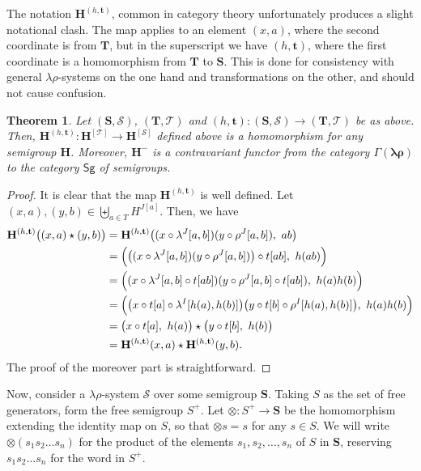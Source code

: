 \documentclass{amsart}
\newtheorem{theorem}{Theorem}
\newcommand{\blambda}{\boldsymbol{\lambda}}
\newcommand{\brho}{\boldsymbol{\rho}}
\begin{document}
The notation $\mathbf{H}^{(h,\mathbf{t})}$, common in category theory 
unfortunately produces a slight notational clash. The map applies to an element
$(x,a)$, where the second coordinate is from $\mathbf{T}$,
but in the superscript we have  $(h,\mathbf{t})$, where the first coordinate is
a homomorphism from $\mathbf{T}$ to $\mathbf{S}$. This is done for consistency
with general $\lambda\rho$-systems on the one hand and
transformations on the other, and should not cause confusion. 


\begin{theorem}\label{trans}
Let $(\mathbf{S},\mathcal{S})$, $(\mathbf{T},\mathcal{T})$ and
$(h, \mathbf{t})\colon (\mathbf{S},\mathcal{S})\to (\mathbf{T},\mathcal{T})$
be as above. Then,
$\mathbf{H}^{(h,\mathbf{t})}\colon 
\mathbf{H}^{[\mathcal{T}]} \to \mathbf{H}^{[\mathcal{S}]}$ defined above
is a homomorphism for any semigroup $\mathbf{H}$.
Moreover, $\mathbf{H}^{-}$ is a contravariant functor from the category
$\Gamma(\blambda\brho)$ to the category $\mathsf{Sg}$ of semigroups.
\end{theorem}

\begin{proof}
It is clear that the map $\mathbf{H}^{(h, \mathbf{t})}$ is well defined.
Let $(x,a), (y,b)\in \biguplus_{a\in T} H^{J[a]}$. Then, we have
\begin{align*}
\mathbf{H}^{(h, \mathbf{t})}\bigl((x,a)\star (y,b)\bigr)
&=\mathbf{H}^{(h,\mathbf{t})}\bigl((x\circ\lambda^J[{a,b}])
    (y\circ\rho^J[{a,b}]),\ ab\bigr)\\ 
&= \Bigl(\bigl((x\circ\lambda^J[{a,b}])(y\circ\rho^J[{a,b}])\bigr)\circ t[ab],\
                                          h(ab)\Bigr)\\   
&= \Bigl((x\circ\lambda^J[{a,b}]\circ t[ab])(y\circ\rho^J[{a,b}]\circ t[ab]),\
h(a)h(b)\Bigr) \\
&= \Bigl(\bigl(x\circ t[a]\circ \lambda^I[{h(a),h(b)}]\bigr)
    \bigl(y\circ t[b]\circ\rho^I[{h(a),h(b)}]\bigr),\ h(a)h(b)\Bigr)\\
&= \bigl(x\circ t[a],\ h(a)\bigr)\star\bigl(y\circ t[b],\ h(b)\bigr)\\
&= \mathbf{H}^{(h, \mathbf{t})}(x,a)\star \mathbf{H}^{(h, \mathbf{t})}(y,b). 
\end{align*}
The proof of the moreover part is straightforward. 
\end{proof}

Now, consider a $\lambda\rho$-system $\mathcal{S}$ over some semigroup 
$\mathbf{S}$. Taking $S$ as the set of free generators, form 
the free semigroup $S^+$. Let $\otimes\colon S^+\to \mathbf{S}$ 
be the homomorphism extending the identity map
on $S$, so that $\otimes s = s$ for any $s\in S$.
We will write
$\otimes(s_1s_2\dots s_n)$ for the product of the elements
$s_1,s_2,\dots, s_n$ of $S$ in $\mathbf{S}$, reserving
$s_1s_2\dots s_n$ for the word in $S^+$. 
\end{document}
